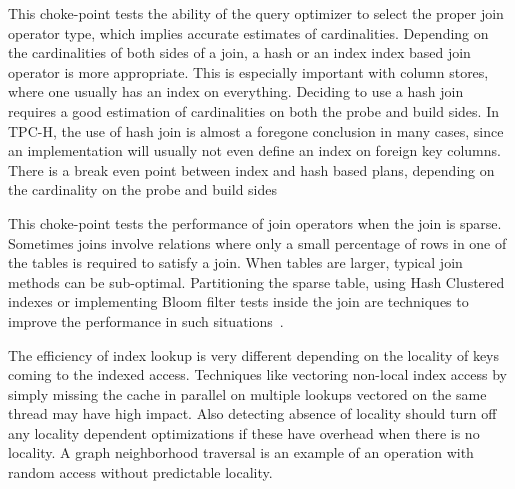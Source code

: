 


This choke-point tests the ability of the query optimizer to select the proper join operator type, which implies accurate estimates of cardinalities.
Depending on the cardinalities of both sides of a join, a hash or an index index based join operator is more appropriate.
This is especially important with column stores, where one usually has an index on everything. Deciding to use a hash join requires a good estimation of cardinalities on both the probe and build sides.
In TPC-H, the use of hash join is almost a foregone conclusion in many cases, since an implementation will usually not even define an index on foreign key columns.
There is a break even point between index and hash based plans, depending on the cardinality on the probe and build sides




This choke-point tests the performance of join operators when the join is sparse. Sometimes joins involve relations where only a small percentage of rows in one of the tables is required to satisfy a join. When tables are larger, typical join methods can be sub-optimal. Partitioning the sparse table, using Hash Clustered indexes or implementing Bloom filter tests inside the join are techniques to improve the performance in such situations~\cite{DBLP:journals/csur/Graefe93}.






%


The efficiency of index lookup is very different depending on the locality of keys coming to the indexed access. Techniques like vectoring non-local index access by simply missing the cache in parallel on multiple lookups vectored on the same thread may have high impact. Also detecting absence of locality should turn off any locality dependent optimizations if these have overhead when there is no locality. A graph neighborhood traversal is an example of an operation with random access without predictable locality.

